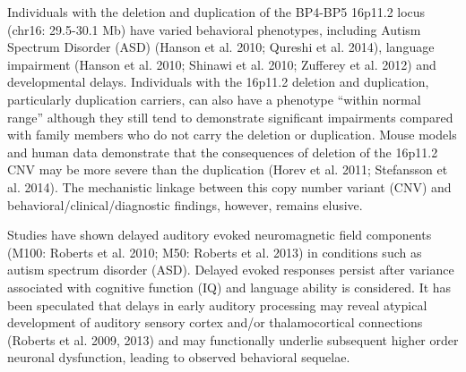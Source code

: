 \documentclass[]{article}
\begin{document}
Individuals with the deletion and duplication of the BP4-BP5 16p11.2
locus (chr16: 29.5-30.1 Mb) have varied behavioral phenotypes, including
Autism Spectrum Disorder (ASD) (Hanson et al. 2010; Qureshi et al.
2014), language impairment (Hanson et al. 2010; Shinawi et al. 2010;
Zufferey et al. 2012) and developmental delays. Individuals with the
16p11.2 deletion and duplication, particularly duplication carriers, can
also have a phenotype ``within normal range'' although they still tend
to demonstrate significant impairments compared with family members who
do not carry the deletion or duplication. Mouse models and human data
demonstrate that the consequences of deletion of the 16p11.2 CNV may be
more severe than the duplication (Horev et al. 2011; Stefansson et al.
2014). The mechanistic linkage between this copy number variant (CNV)
and behavioral/clinical/diagnostic findings, however, remains elusive.

\medskip

Studies have shown delayed auditory evoked neuromagnetic field
components (M100: Roberts et al. 2010; M50: Roberts et al. 2013) in
conditions such as autism spectrum disorder (ASD). Delayed evoked
responses persist after variance associated with cognitive function (IQ)
and language ability is considered. It has been speculated that delays
in early auditory processing may reveal atypical development of auditory
sensory cortex and/or thalamocortical connections (Roberts et al. 2009,
2013) and may functionally underlie subsequent higher order neuronal
dysfunction, leading to observed behavioral sequelae.

\medskip
\end{document}
